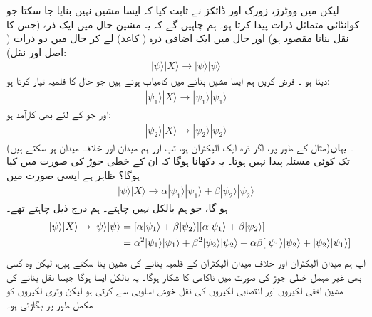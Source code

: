 لیکن میں  ووٹرز، زورک اور ڈائکز نے ثابت کیا کہ ایسا مشین  نہیں بنایا   جا سکتا  جو کوانٹائی متماثل ذرات پیدا کرتا ہو۔ ہم چاہیں گے کہ یہ مشین حال  میں ایک ذرہ (جس کا نقل بنانا مقصود ہو)  اور حال  میں ایک اضافی ذرہ (   کاغذ)  لے  کر  حال  میں   دو ذرات (  اصل اور نقل):
\begin{align}
	|\psi\rangle| X\rangle\to|\psi\rangle|\psi\rangle
\end{align}
  دیتا ہو ۔ فرض کریں ہم ایسا مشین بنانے میں کامیاب ہوتے ہیں جو حال  کا قلمیہ  تیار کرتا ہو: 
\begin{align}
	|\psi_1\rangle| X\rangle\to|\psi_1\rangle|\psi_1\rangle
\end{align}
اور جو   کے لئے بھی کارآمد ہو:
\begin{align}
	|\psi_2\rangle| X\rangle\to|\psi_2\rangle|\psi_2\rangle
\end{align}
(مثال کے طور پر،  اگر ذرہ ایک الیکٹران ہو،  تب  اور  ہم میدان اور خلاف میدان ہو سکتے ہیں)۔ یہاں تک کوئی مسئلہ پیدا نہیں ہوتا۔ یہ دکھانا ہوگا کہ ان کے  خطی جوڑ  کی صورت میں کیا ہوگا؟ ظاہر ہے ایسی صورت میں
\begin{align}
	|\psi\rangle| X\rangle\to\alpha|\psi_1\rangle|\psi_1\rangle+\beta|\psi_2\rangle|\psi_2\rangle
\end{align}
ہو گا،  جو ہم  بالکل نہیں چاہتے۔ ہم درج ذیل چاہتے  تھے۔
\begin{align}
\hspace*{1cm} |\psi\rangle| X\rangle\to|\psi\rangle|\psi\rangle &= [\alpha|\psi_1\rangle+\beta|\psi_2\rangle][\alpha|\psi_1\rangle+\beta|\psi_2\rangle]\nonumber \\
	&= \alpha^2|\psi_1\rangle|\psi_1\rangle+\beta^2|\psi_2\rangle|\psi_2\rangle+\alpha\beta[|\psi_1\rangle|\psi_2\rangle+|\psi_2\rangle|\psi_1\rangle]
\end{align}
آپ ہم میدان الیکٹران اور خلاف میدان الیکٹران کے قلمیہ  بنانے کی مشین بنا سکتے ہیں،  لیکن وہ کسی بھی  غیر مہمل   خطی جوڑ کی صورت میں ناکامی کا شکار ہوگا۔  یہ بالکل ایسا ہوگا  جیسا نقل بنانے کی مشین  افقی لکیروں اور انتصابی لکیروں کی نقل خوش اسلوبی سے کرتی  ہو لیکن وتری لکیروں کو مکمل طور پر بگاڑتی  ہو۔

